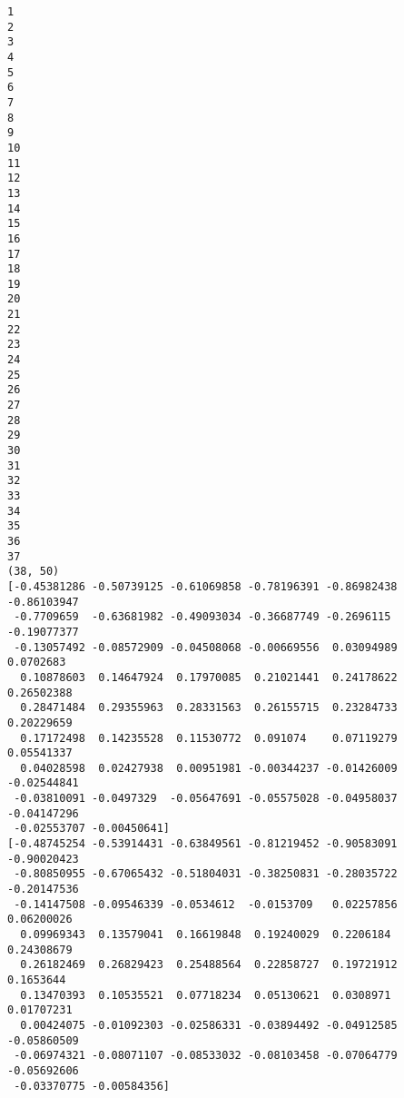 \documentclass[11pt]{article}
\begin{document}
    \begin{Verbatim}[commandchars=\\\{\}]
1
2
3
4
5
6
7
8
9
10
11
12
13
14
15
16
17
18
19
20
21
22
23
24
25
26
27
28
29
30
31
32
33
34
35
36
37
(38, 50)
[-0.45381286 -0.50739125 -0.61069858 -0.78196391 -0.86982438 -0.86103947
 -0.7709659  -0.63681982 -0.49093034 -0.36687749 -0.2696115  -0.19077377
 -0.13057492 -0.08572909 -0.04508068 -0.00669556  0.03094989  0.0702683
  0.10878603  0.14647924  0.17970085  0.21021441  0.24178622  0.26502388
  0.28471484  0.29355963  0.28331563  0.26155715  0.23284733  0.20229659
  0.17172498  0.14235528  0.11530772  0.091074    0.07119279  0.05541337
  0.04028598  0.02427938  0.00951981 -0.00344237 -0.01426009 -0.02544841
 -0.03810091 -0.0497329  -0.05647691 -0.05575028 -0.04958037 -0.04147296
 -0.02553707 -0.00450641]
[-0.48745254 -0.53914431 -0.63849561 -0.81219452 -0.90583091 -0.90020423
 -0.80850955 -0.67065432 -0.51804031 -0.38250831 -0.28035722 -0.20147536
 -0.14147508 -0.09546339 -0.0534612  -0.0153709   0.02257856  0.06200026
  0.09969343  0.13579041  0.16619848  0.19240029  0.2206184   0.24308679
  0.26182469  0.26829423  0.25488564  0.22858727  0.19721912  0.1653644
  0.13470393  0.10535521  0.07718234  0.05130621  0.0308971   0.01707231
  0.00424075 -0.01092303 -0.02586331 -0.03894492 -0.04912585 -0.05860509
 -0.06974321 -0.08071107 -0.08533032 -0.08103458 -0.07064779 -0.05692606
 -0.03370775 -0.00584356]

    \end{Verbatim}
\end{document}
